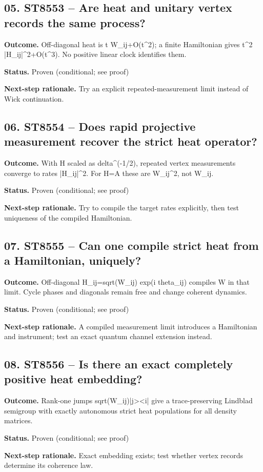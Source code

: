 \subsection*{05. ST8553 -- Are heat and unitary vertex records the same process?}
\noindent\textbf{Outcome.} Off-diagonal heat is t W\_ij+O(t\textasciicircum{}2); a finite Hamiltonian gives t\textasciicircum{}2 |H\_ij|\textasciicircum{}2+O(t\textasciicircum{}3). No positive linear clock identifies them.\par
\noindent\textbf{Status.} Proven (conditional; see proof)\par
\noindent\textbf{Next-step rationale.} Try an explicit repeated-measurement limit instead of Wick continuation.\par\medskip
\subsection*{06. ST8554 -- Does rapid projective measurement recover the strict heat operator?}
\noindent\textbf{Outcome.} With H scaled as delta\textasciicircum{}(-1/2), repeated vertex measurements converge to rates |H\_ij|\textasciicircum{}2. For H=A these are W\_ij\textasciicircum{}2, not W\_ij.\par
\noindent\textbf{Status.} Proven (conditional; see proof)\par
\noindent\textbf{Next-step rationale.} Try to compile the target rates explicitly, then test uniqueness of the compiled Hamiltonian.\par\medskip
\subsection*{07. ST8555 -- Can one compile strict heat from a Hamiltonian, uniquely?}
\noindent\textbf{Outcome.} Off-diagonal H\_ij=sqrt(W\_ij) exp(i theta\_ij) compiles W in that limit. Cycle phases and diagonals remain free and change coherent dynamics.\par
\noindent\textbf{Status.} Proven (conditional; see proof)\par
\noindent\textbf{Next-step rationale.} A compiled measurement limit introduces a Hamiltonian and instrument; test an exact quantum channel extension instead.\par\medskip
\subsection*{08. ST8556 -- Is there an exact completely positive heat embedding?}
\noindent\textbf{Outcome.} Rank-one jumps sqrt(W\_ij)|j\textgreater{}\textless{}i| give a trace-preserving Lindblad semigroup with exactly autonomous strict heat populations for all density matrices.\par
\noindent\textbf{Status.} Proven (conditional; see proof)\par
\noindent\textbf{Next-step rationale.} Exact embedding exists; test whether vertex records determine its coherence law.\par\medskip
